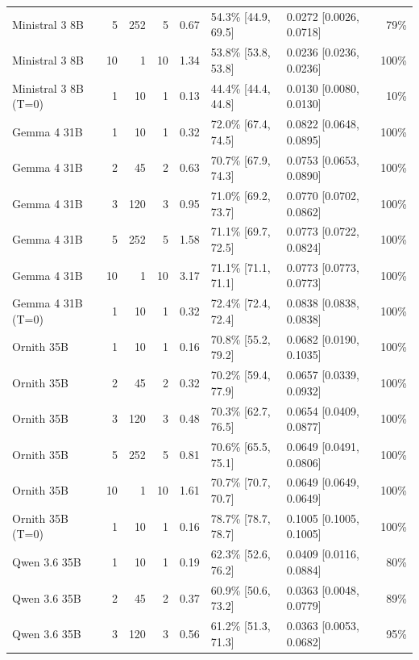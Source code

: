 \begin{table}[htbp]
{\begin{tabular}{lrrrrllr}
  Ministral 3 8B & 5 & 252 & 5 & 0.67 & 54.3\% \tiny[44.9, 69.5] & 0.0272 \tiny[0.0026, 0.0718] & 79\% \\
  Ministral 3 8B & 10 & 1 & 10 & 1.34 & 53.8\% \tiny[53.8, 53.8] & 0.0236 \tiny[0.0236, 0.0236] & 100\% \\
  Ministral 3 8B (T=0) & 1 & 10 & 1 & 0.13 & 44.4\% \tiny[44.4, 44.8] & 0.0130 \tiny[0.0080, 0.0130] & 10\% \\
\midrule
  Gemma 4 31B & 1 & 10 & 1 & 0.32 & 72.0\% \tiny[67.4, 74.5] & 0.0822 \tiny[0.0648, 0.0895] & 100\% \\
  Gemma 4 31B & 2 & 45 & 2 & 0.63 & 70.7\% \tiny[67.9, 74.3] & 0.0753 \tiny[0.0653, 0.0890] & 100\% \\
  Gemma 4 31B & 3 & 120 & 3 & 0.95 & 71.0\% \tiny[69.2, 73.7] & 0.0770 \tiny[0.0702, 0.0862] & 100\% \\
  Gemma 4 31B & 5 & 252 & 5 & 1.58 & 71.1\% \tiny[69.7, 72.5] & 0.0773 \tiny[0.0722, 0.0824] & 100\% \\
  Gemma 4 31B & 10 & 1 & 10 & 3.17 & 71.1\% \tiny[71.1, 71.1] & 0.0773 \tiny[0.0773, 0.0773] & 100\% \\
  Gemma 4 31B (T=0) & 1 & 10 & 1 & 0.32 & 72.4\% \tiny[72.4, 72.4] & 0.0838 \tiny[0.0838, 0.0838] & 100\% \\
\midrule
  Ornith 35B & 1 & 10 & 1 & 0.16 & 70.8\% \tiny[55.2, 79.2] & 0.0682 \tiny[0.0190, 0.1035] & 100\% \\
  Ornith 35B & 2 & 45 & 2 & 0.32 & 70.2\% \tiny[59.4, 77.9] & 0.0657 \tiny[0.0339, 0.0932] & 100\% \\
  Ornith 35B & 3 & 120 & 3 & 0.48 & 70.3\% \tiny[62.7, 76.5] & 0.0654 \tiny[0.0409, 0.0877] & 100\% \\
  Ornith 35B & 5 & 252 & 5 & 0.81 & 70.6\% \tiny[65.5, 75.1] & 0.0649 \tiny[0.0491, 0.0806] & 100\% \\
  Ornith 35B & 10 & 1 & 10 & 1.61 & 70.7\% \tiny[70.7, 70.7] & 0.0649 \tiny[0.0649, 0.0649] & 100\% \\
  Ornith 35B (T=0) & 1 & 10 & 1 & 0.16 & 78.7\% \tiny[78.7, 78.7] & 0.1005 \tiny[0.1005, 0.1005] & 100\% \\
\midrule
  Qwen 3.6 35B & 1 & 10 & 1 & 0.19 & 62.3\% \tiny[52.6, 76.2] & 0.0409 \tiny[0.0116, 0.0884] & 80\% \\
  Qwen 3.6 35B & 2 & 45 & 2 & 0.37 & 60.9\% \tiny[50.6, 73.2] & 0.0363 \tiny[0.0048, 0.0779] & 89\% \\
  Qwen 3.6 35B & 3 & 120 & 3 & 0.56 & 61.2\% \tiny[51.3, 71.3] & 0.0363 \tiny[0.0053, 0.0682] & 95\% \\

\end{tabular}}
\end{table}
